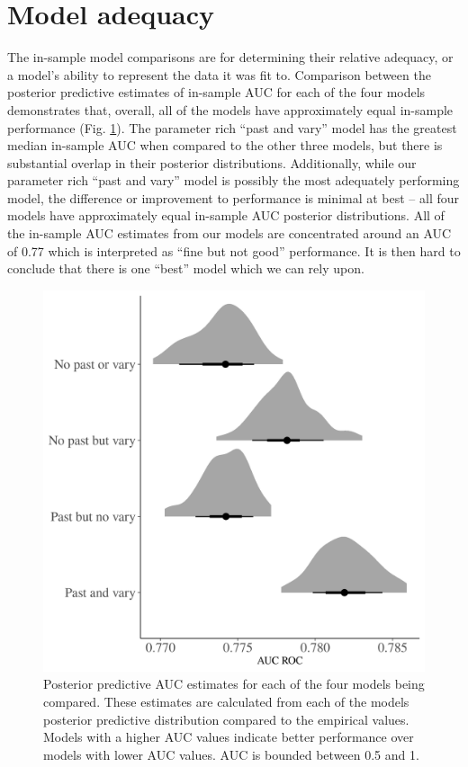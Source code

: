 \documentclass[12pt,letterpaper]{article}
\begin{document}
\section{Model adequacy}

The in-sample model comparisons are for determining their relative adequacy, or a model's ability to represent the data it was fit to. Comparison between the posterior predictive estimates of in-sample AUC for each of the four models demonstrates that, overall, all of the models have approximately equal in-sample performance (Fig. \ref{fig:auc_hist}). The parameter rich ``past and vary'' model has the greatest median in-sample AUC when compared to the other three models, but there is substantial overlap in their posterior distributions. Additionally, while our parameter rich ``past and vary'' model is possibly the most adequately performing model, the difference or improvement to performance is minimal at best -- all four models have approximately equal in-sample AUC posterior distributions. All of the in-sample AUC estimates from our models are concentrated around an AUC of 0.77 which is interpreted as ``fine but not good'' performance. It is then hard to conclude that there is one ``best'' model which we can rely upon. 
\begin{figure}[ht]
  \centering
  \includegraphics[width=\textwidth,height=0.5\textheight,keepaspectratio=true]{../results/figure/auc_hist}
  \caption{Posterior predictive AUC estimates for each of the four models being compared. These estimates are calculated from each of the models posterior predictive distribution compared to the empirical values. Models with a higher AUC values indicate better performance over models with lower AUC values. AUC is bounded between 0.5 and 1.}
  \label{fig:auc_hist}
\end{figure}
\end{document}
